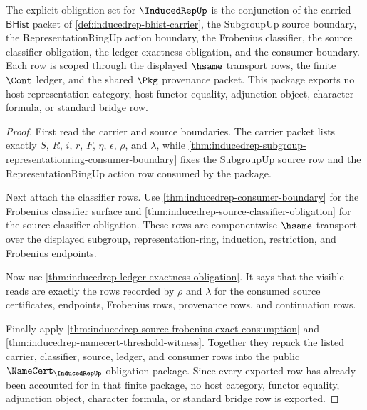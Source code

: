 \begin{theorem}
\label{thm:inducedrep-obligation-closure-package}
The explicit obligation set for $\InducedRepUp$ is the conjunction of the
carried $\mathsf{BHist}$ packet of \autoref{def:inducedrep-bhist-carrier}, the
SubgroupUp source boundary, the RepresentationRingUp action boundary, the
Frobenius classifier, the source classifier obligation, the ledger exactness
obligation, and the consumer boundary. Each row is scoped through the displayed
$\hsame$ transport rows, the finite $\Cont$ ledger, and the shared $\Pkg$
provenance packet. This package exports no host representation category, host
functor equality, adjunction object, character formula, or standard bridge row.
\end{theorem}
\begin{proof}
First read the carrier and source boundaries. The carrier packet lists exactly
$S$, $R$, $i$, $r$, $F$, $\eta$, $\epsilon$, $\rho$, and $\lambda$, while
\autoref{thm:inducedrep-subgroup-representationring-consumer-boundary} fixes
the SubgroupUp source row and the RepresentationRingUp action row consumed by
the package.

Next attach the classifier rows. Use
\autoref{thm:inducedrep-consumer-boundary} for the Frobenius classifier
surface and \autoref{thm:inducedrep-source-classifier-obligation} for the
source classifier obligation. These rows are componentwise $\hsame$ transport
over the displayed subgroup, representation-ring, induction, restriction, and
Frobenius endpoints.

Now use \autoref{thm:inducedrep-ledger-exactness-obligation}. It says that
the visible reads are exactly the rows recorded by $\rho$ and $\lambda$ for
the consumed source certificates, endpoints, Frobenius rows, provenance rows,
and continuation rows.

Finally apply \autoref{thm:inducedrep-source-frobenius-exact-consumption} and
\autoref{thm:inducedrep-namecert-threshold-witness}. Together they repack the
listed carrier, classifier, source, ledger, and consumer rows into the public
$\NameCert_{\InducedRepUp}$ obligation package. Since every exported row has
already been accounted for in that finite package, no host category, functor
equality, adjunction object, character formula, or standard bridge row is
exported.
\end{proof}

